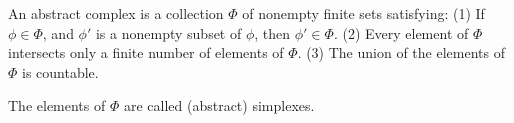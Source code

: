 An abstract complex is a collection $\Phi$ of nonempty finite sets satisfying:
(1) If $\phi \in \Phi$, and $\phi'$ is a nonempty subset of $\phi$, then $\phi' \in \Phi$.
(2) Every element of $\Phi$ intersects only a finite number of elements of $\Phi$.
(3) The union of the elements of $\Phi$ is countable.

The elements of $\Phi$ are called (abstract) simplexes.
